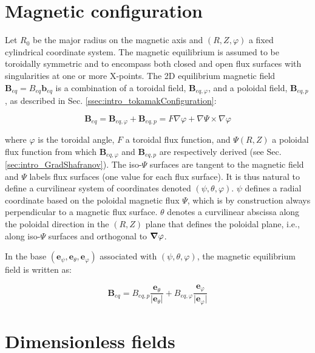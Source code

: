 \section{Magnetic configuration}
\label{sec:S3X_CoordinateSystem}
Let $R_0$ be the major radius on the magnetic axis and $(R, Z, \varphi)$ a fixed cylindrical coordinate system. The magnetic equilibrium is assumed to be toroidally symmetric and to encompass both closed and open flux surfaces with singularities at one or more X-points. The 2D equilibrium magnetic field $\mathbf{B}_{eq} = B_{eq} \mathbf{b}_{eq}$ is a combination of a toroidal field, $\mathbf{B}_{eq,\varphi}$, and a poloidal field, $\mathbf{B}_{eq,p}$, as described in Sec. \ref{ssec:intro_tokamakConfiguration}:

\begin{equation}
	\mathbf{B}_{eq} = \mathbf{B}_{eq,\varphi} + \mathbf{B}_{eq,p} = F \nabla{\varphi} + \nabla{\Psi} \times \nabla{\varphi}
\end{equation}

where $\varphi$ is the toroidal angle, $F$ a toroidal flux function, and $\Psi(R,Z)$ a poloidal flux function from which $\mathbf{B}_{eq,\varphi}$ and $\mathbf{B}_{eq,p}$ are respectively derived (see Sec. \ref{sec:intro_GradShafranov}). The iso-$\Psi$ surfaces are tangent to the magnetic field and $\Psi$ labels flux surfaces (one value for each flux surface). It is thus natural to define a curvilinear system of coordinates denoted $(\psi, \theta, \varphi)$. $\psi$ defines a radial coordinate based on the poloidal magnetic flux $\Psi$, which is by construction always perpendicular to a magnetic flux surface. $\theta$ denotes a curvilinear abscissa along the poloidal direction in the $(R, Z)$ plane that defines the poloidal plane, i.e., along iso-$\Psi$ surfaces and orthogonal to $\grad  \varphi$. \newline

In the base $(\boldsymbol{e}_{\psi}, \boldsymbol{e}_{\theta}, \boldsymbol{e}_{\varphi})$ associated with $(\psi, \theta, \varphi)$, the magnetic equilibrium field is written as:

\begin{equation}
	\boldsymbol{B}_{eq} = B_{eq,p} \frac{\boldsymbol{e}_{\theta}}{\vert \boldsymbol{e}_{\theta} \vert} + B_{eq,\varphi} \frac{\boldsymbol{e}_{\varphi}}{\vert \boldsymbol{e}_{\varphi} \vert}
\end{equation}



\section{Dimensionless fields}
\label{sec:S3X_referenceValues}

